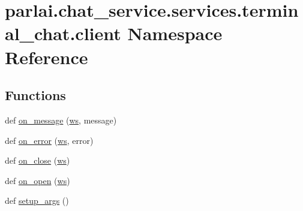 \hypertarget{namespaceparlai_1_1chat__service_1_1services_1_1terminal__chat_1_1client}{}\section{parlai.\+chat\+\_\+service.\+services.\+terminal\+\_\+chat.\+client Namespace Reference}
\label{namespaceparlai_1_1chat__service_1_1services_1_1terminal__chat_1_1client}
\subsection*{Functions}
\begin{DoxyCompactItemize}
\item 
def \hyperlink{namespaceparlai_1_1chat__service_1_1services_1_1terminal__chat_1_1client_a0ef2bb2bd3b966dcdd8402a92b999708}{on\+\_\+message} (\hyperlink{namespaceparlai_1_1chat__service_1_1services_1_1terminal__chat_1_1client_a8cf84390ff82d21619917c2366685540}{ws}, message)
\item 
def \hyperlink{namespaceparlai_1_1chat__service_1_1services_1_1terminal__chat_1_1client_a261a307d930994b292f713c0fafbb575}{on\+\_\+error} (\hyperlink{namespaceparlai_1_1chat__service_1_1services_1_1terminal__chat_1_1client_a8cf84390ff82d21619917c2366685540}{ws}, error)
\item 
def \hyperlink{namespaceparlai_1_1chat__service_1_1services_1_1terminal__chat_1_1client_a02c04f40cfa11defbf5c83bbe46aba00}{on\+\_\+close} (\hyperlink{namespaceparlai_1_1chat__service_1_1services_1_1terminal__chat_1_1client_a8cf84390ff82d21619917c2366685540}{ws})
\item 
def \hyperlink{namespaceparlai_1_1chat__service_1_1services_1_1terminal__chat_1_1client_a9186bee0436623cc10a378752ba8a61c}{on\+\_\+open} (\hyperlink{namespaceparlai_1_1chat__service_1_1services_1_1terminal__chat_1_1client_a8cf84390ff82d21619917c2366685540}{ws})
\item 
def \hyperlink{namespaceparlai_1_1chat__service_1_1services_1_1terminal__chat_1_1client_abcdfe1196113d8ab4476dcde362c83d8}{setup\+\_\+args} ()
\end{DoxyCompactItemize}
